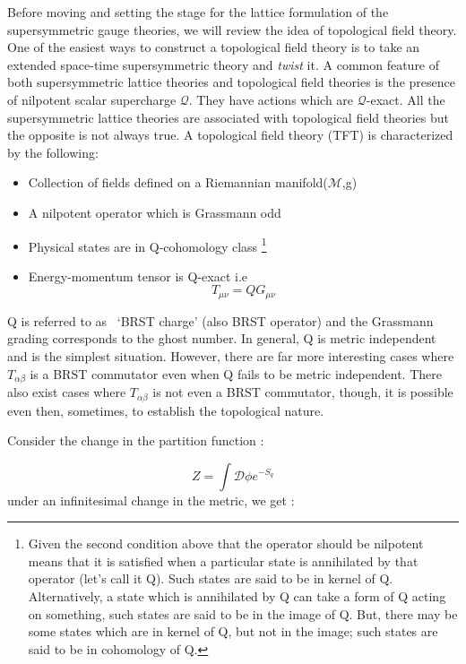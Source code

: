 Before moving and setting the stage for the lattice formulation of the supersymmetric gauge theories, we will review
the idea of topological field theory. One of the easiest ways to construct a topological field theory is to 
take an extended space-time supersymmetric theory and \textit{twist} it. A common feature of both supersymmetric lattice
 theories and topological field theories is the presence of nilpotent scalar supercharge $\mathcal{Q}$. 
 They have actions which are $\mathcal{Q}$-exact. 
All the supersymmetric lattice theories are associated with topological field theories but the opposite is not always true. 
A topological field theory (TFT) is characterized by the following:
\begin{itemize}
\item Collection of fields defined on a Riemannian manifold($\textbf{$\mathcal{M}$}$,g)
\item A nilpotent operator which is Grassmann odd
\item Physical states are in Q-cohomology class \footnote{Given the second condition above that the operator should 
be nilpotent means that it is satisfied when a particular state is annihilated by that operator (let's call it Q). Such states 
are said to be in kernel of Q. Alternatively, a state which is annihilated by Q can take a form of Q acting on something, 
such states are said to be in the image of Q. But, there may be some states which are in kernel of Q, but not in the image; 
such states are said to be in cohomology of Q.} 
\item Energy-momentum tensor is Q-exact i.e \[ T_{\mu\nu} = Q G_{\mu\nu} \]
\end{itemize}

Q is referred to as ~`BRST charge' (also BRST operator) and the Grassmann grading corresponds to the ghost number. 
In general, Q is metric independent and is the simplest situation. However, there are far more interesting cases 
where $T_{\alpha\beta}$ is a BRST commutator even when Q fails to be metric independent. There also exist cases 
where $T_{\alpha\beta}$ is not even a BRST commutator, though, it is possible even then, sometimes, to establish the
topological nature. 

Consider the change in the partition function :

\begin{equation}
Z = \int \mathcal{D} \phi e^{-S_{q}}
\end{equation}
under an infinitesimal change in the metric, we get :




